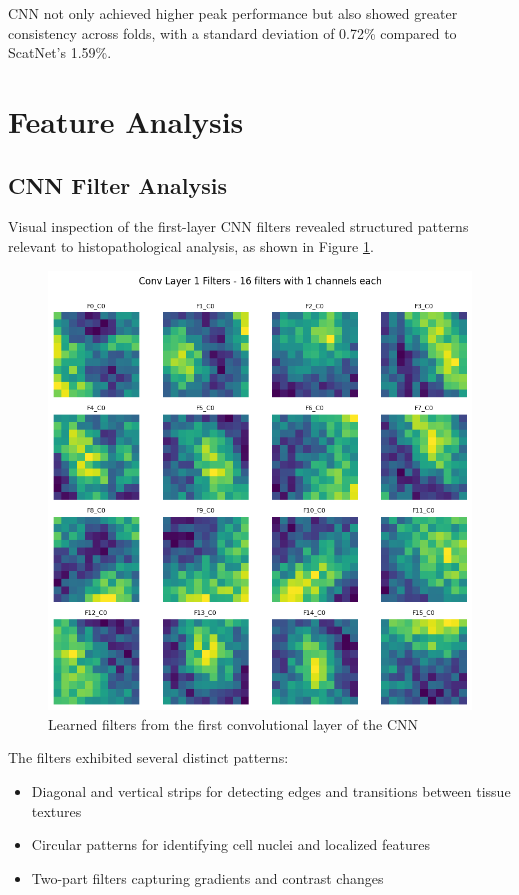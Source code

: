 \documentclass[10pt,twocolumn]{article}
\begin{document}
CNN not only achieved higher peak performance but also showed greater consistency across folds, with a standard deviation of 0.72\% compared to ScatNet's 1.59\%.

\section{Feature Analysis}
\subsection{CNN Filter Analysis}
Visual inspection of the first-layer CNN filters revealed structured patterns relevant to histopathological analysis, as shown in Figure \ref{fig:cnn_filters}.

\begin{figure}[h]
\centering
\includegraphics[width=0.8\columnwidth]{imgs/cnn_filters.png}
\caption{Learned filters from the first convolutional layer of the CNN}
\label{fig:cnn_filters}
\end{figure}

The filters exhibited several distinct patterns:
\begin{itemize}
    \item Diagonal and vertical strips for detecting edges and transitions between tissue textures
    \item Circular patterns for identifying cell nuclei and localized features
    \item Two-part filters capturing gradients and contrast changes
\end{itemize}
\end{document}
